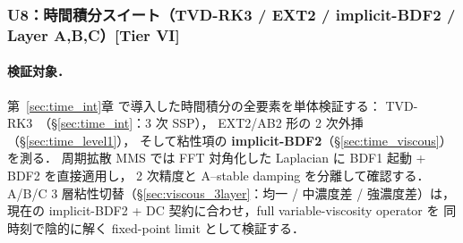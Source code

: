 %
\subsubsection{U8：時間積分スイート（TVD-RK3 / EXT2 / implicit-BDF2 / Layer A,B,C）[Tier VI]}
\label{sec:U8_time_integration}

\paragraph{検証対象．}
第~\ref{sec:time_int}章 で導入した時間積分の全要素を単体検証する：
TVD-RK3~\cite{ShuOsher1988,JiangShu1996}（§\ref{sec:time_int}：3 次 SSP），
EXT2/AB2 形の 2 次外挿（§\ref{sec:time_level1}），
そして粘性項の \textbf{implicit-BDF2}（§\ref{sec:time_viscous}）を測る．
周期拡散 MMS では FFT 対角化した Laplacian に BDF1 起動 + BDF2 を直接適用し，
2 次精度と A--stable damping を分離して確認する．
A/B/C 3 層粘性切替（§\ref{sec:viscous_3layer}：均一 / 中濃度差 / 強濃度差）は，
現在の implicit-BDF2 + DC 契約に合わせ，full variable-viscosity operator を
同時刻で陰的に解く fixed-point limit として検証する．

